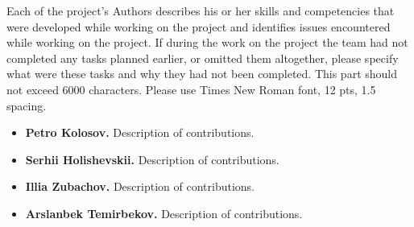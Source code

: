 Each of the project's Authors describes his or her skills and competencies that were developed while working on the
project and identifies issues encountered while working on the project.
If during the work on the project the team had not completed any tasks planned earlier, or omitted them altogether,
please specify what were these tasks and why they had not been completed.
This part should not exceed 6000 characters.
Please use Times New Roman font, 12 pts, 1.5 spacing.

\begin{itemize}
    \item \textbf{Petro Kolosov.} Description of contributions.
    \item \textbf{Serhii Holishevskii.} Description of contributions.
    \item \textbf{Illia Zubachov.} Description of contributions.
    \item \textbf{Arslanbek Temirbekov.} Description of contributions.
\end{itemize}
